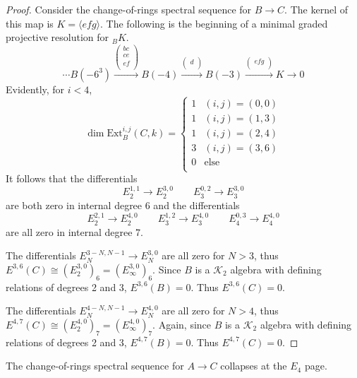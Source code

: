 \documentclass[11pt,righttag]{amsart}
\begin{document}
\begin{proof}
Consider the change-of-rings spectral sequence for $B\rightarrow C$. The kernel of this map is $K={\langle} efg{\rangle}$. The following is the beginning of a minimal graded projective resolution for $_BK$.
$$\cdots B(-6^3)\xrightarrow{\begin{pmatrix} bc\\ ce\\ ef\\ \end{pmatrix}} B(-4)\xrightarrow{\begin{pmatrix}d\\ \end{pmatrix}} B(-3) \xrightarrow{\begin{pmatrix} efg\\ \end{pmatrix}} K\rightarrow 0$$
Evidently, for $i<4$, 
$$\dim \text{Ext}_B^{i,j}(C,k)=\begin{cases} 1 & (i,j)=(0,0)\\ 1 & (i,j)=(1,3)\\ 1 &(i,j)=(2,4)\\  3 & (i,j)=(3,6)\\  0 & \text{else}\\ \end{cases}$$
It follows  that the differentials
$$E_2^{1,1}\rightarrow E_2^{3,0}\qquad E_3^{0,2}\rightarrow E_3^{3,0}$$
are both zero in internal degree 6 and the differentials
$$E_2^{2,1}\rightarrow E_2^{4,0}\qquad E_3^{1,2}\rightarrow E_3^{4,0}\qquad E_4^{0,3}\rightarrow E_4^{4,0}$$
are all zero in internal degree 7. 

The differentials $E_N^{3-N,N-1}\rightarrow E_N^{3,0}$ are all zero for $N>3$, thus $E^{3,6}(C)\cong (E_2^{3,0})_6 = (E_{\infty}^{3,0})_6$. Since $B$ is a ${{\mathcal K}}_2$ algebra  with defining relations of degrees 2 and 3, $E^{3,6}(B)=0$. Thus $E^{3,6}(C)=0$.

The differentials $E_N^{4-N,N-1}\rightarrow E_N^{4,0}$ are all zero for $N>4$, thus $E^{4,7}(C)\cong (E_2^{4,0})_7 = (E_{\infty}^{4,0})_7$. Again, since $B$ is a ${{\mathcal K}}_2$ algebra  with defining relations of degrees 2 and 3,  $E^{4,7}(B)=0$. Thus $E^{4,7}(C)=0$.

\end{proof}

\begin{lemma}
The change-of-rings spectral sequence for $A\rightarrow C$ collapses at the $E_4$ page.
\end{lemma}
\end{document}
